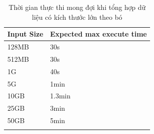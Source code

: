 \begin{longtable}{|l|l|}
\hline
Input Size & Expected max execute time \\ \hline
\endhead
%
128MB                             & 30s                       \\ \hline
512MB                             & 30s                       \\ \hline
1G                                & 40s                       \\ \hline
5G                                & 1min                      \\ \hline
10GB                              & 1.3min                    \\ \hline
25GB                              & 3min                      \\ \hline
50GB                              & 5min                      \\ \hline
\caption{Thời gian thực thi mong đợi khi tổng hợp dữ liệu có kích thước lớn theo bó}
\label{tab:batch-time-eval}\\
\end{longtable}